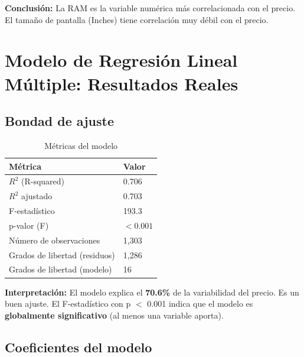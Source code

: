 \documentclass[12pt,a4paper]{article}
\begin{document}
\textbf{Conclusión:} La RAM es la variable numérica más correlacionada con el precio. El tamaño de pantalla (Inches) tiene correlación muy débil con el precio.

\section{Modelo de Regresión Lineal Múltiple: Resultados Reales}

\subsection{Bondad de ajuste}

\begin{table}[H]
\centering
\caption{Métricas del modelo}
\begin{tabular}{ll}
\toprule
\textbf{Métrica} & \textbf{Valor} \\
\midrule
$R^2$ (R-squared) & 0.706 \\
$R^2$ ajustado & 0.703 \\
F-estadístico & 193.3 \\
p-valor (F) & $<0.001$ \\
Número de observaciones & 1{,}303 \\
Grados de libertad (residuos) & 1{,}286 \\
Grados de libertad (modelo) & 16 \\
\bottomrule
\end{tabular}
\end{table}

\textbf{Interpretación:} El modelo explica el \textbf{70.6\%} de la variabilidad del precio. Es un buen ajuste. El F-estadístico con p $<$ 0.001 indica que el modelo es \textbf{globalmente significativo} (al menos una variable aporta).

\subsection{Coeficientes del modelo}
\end{document}
